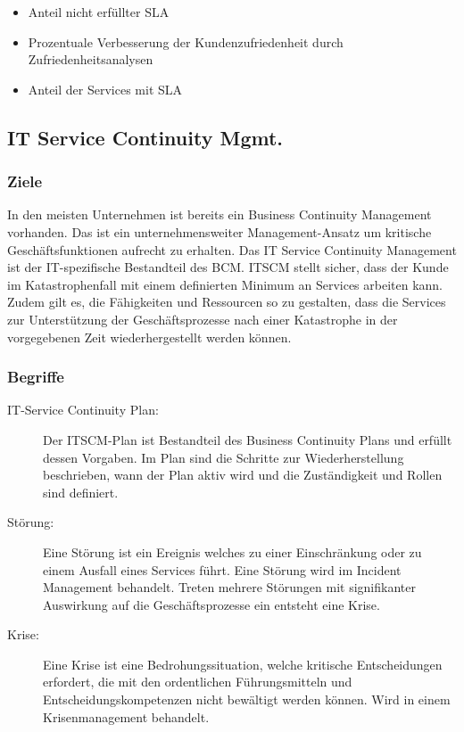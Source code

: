 \begin{itemize}
	\item Anteil nicht erfüllter SLA
	\item Prozentuale Verbesserung der Kundenzufriedenheit durch Zufriedenheitsanalysen
	\item Anteil der Services mit SLA
\end{itemize}

\subsection{IT Service Continuity Mgmt.}

\subsubsection{Ziele}

In den meisten Unternehmen ist bereits ein Business Continuity Management vorhanden. Das ist ein unternehmensweiter Management-Ansatz um kritische Geschäftsfunktionen aufrecht zu erhalten. Das IT Service Continuity Management ist der IT-spezifische Bestandteil des BCM. ITSCM stellt sicher, dass der Kunde im Katastrophenfall mit einem definierten Minimum an Services arbeiten kann. Zudem gilt es, die Fähigkeiten und Ressourcen so zu gestalten, dass die Services zur Unterstützung der Geschäftsprozesse nach einer Katastrophe in der vorgegebenen Zeit wiederhergestellt werden können.

\subsubsection{Begriffe}

\begin{description}
	\item[IT-Service Continuity Plan:] Der ITSCM-Plan ist Bestandteil des Business Continuity Plans und erfüllt dessen Vorgaben. Im Plan sind die Schritte zur Wiederherstellung beschrieben, wann der Plan aktiv wird und die Zuständigkeit und Rollen sind definiert.
	\item[Störung:] Eine Störung ist ein Ereignis welches zu einer Einschränkung oder zu einem Ausfall eines Services führt. Eine Störung wird im Incident Management behandelt. Treten mehrere Störungen mit signifikanter Auswirkung auf die Geschäftsprozesse ein entsteht eine Krise.
	\item[Krise:] Eine Krise ist eine Bedrohungssituation, welche kritische Entscheidungen erfordert, die mit den ordentlichen Führungsmitteln und Entscheidungskompetenzen nicht bewältigt werden können. Wird in einem Krisenmanagement behandelt.
\end{description}

